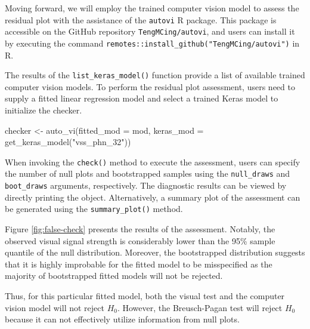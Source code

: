 \documentclass[]{interact}
\theoremstyle{plain}%
\theoremstyle{definition}
\theoremstyle{remark}
\newenvironment{Shaded}{\begin{snugshade}}{\end{snugshade}}
\newcommand{\AttributeTok}[1]{\textcolor[rgb]{0.77,0.63,0.00}{#1}}
\newcommand{\FunctionTok}[1]{\textcolor[rgb]{0.00,0.00,0.00}{#1}}
\newcommand{\NormalTok}[1]{#1}
\newcommand{\OtherTok}[1]{\textcolor[rgb]{0.56,0.35,0.01}{#1}}
\newcommand{\SpecialCharTok}[1]{\textcolor[rgb]{0.00,0.00,0.00}{#1}}
\newcommand{\StringTok}[1]{\textcolor[rgb]{0.31,0.60,0.02}{#1}}
\begin{document}
Moving forward, we will employ the trained computer vision model to
assess the residual plot with the assistance of the \texttt{autovi} R
package. This package is accessible on the GitHub repository
\texttt{TengMCing/autovi}, and users can install it by executing the
command \texttt{remotes::install\_github("TengMCing/autovi")} in R.

The results of the \texttt{list\_keras\_model()} function provide a list
of available trained computer vision models. To perform the residual
plot assessment, users need to supply a fitted linear regression model
and select a trained Keras model to initialize the checker.

\begin{Shaded}
\begin{Highlighting}[]
\NormalTok{checker }\OtherTok{\textless{}{-}} \FunctionTok{auto\_vi}\NormalTok{(}\AttributeTok{fitted\_mod =}\NormalTok{ mod, }
                   \AttributeTok{keras\_mod =} \FunctionTok{get\_keras\_model}\NormalTok{(}\StringTok{"vss\_phn\_32"}\NormalTok{))}
\end{Highlighting}
\end{Shaded}

When invoking the \texttt{check()} method to execute the assessment,
users can specify the number of null plots and bootstrapped samples
using the \texttt{null\_draws} and \texttt{boot\_draws} arguments,
respectively. The diagnostic results can be viewed by directly printing
the object. Alternatively, a summary plot of the assessment can be
generated using the \texttt{summary\_plot()} method.

\begin{Shaded}
\end{Shaded}

Figure \ref{fig:false-check} presents the results of the assessment.
Notably, the observed visual signal strength is considerably lower than
the 95\% sample quantile of the null distribution. Moreover, the
bootstrapped distribution suggests that it is highly improbable for the
fitted model to be misspecified as the majority of bootstrapped fitted
models will not be rejected.

Thus, for this particular fitted model, both the visual test and the
computer vision model will not reject \(H_0\). However, the
Breusch-Pagan test will reject \(H_0\) because it can not effectively
utilize information from null plots.
\end{document}
